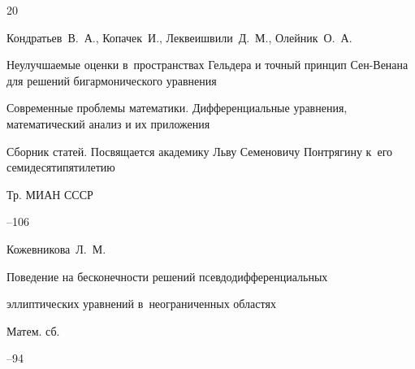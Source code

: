 \begin{thebibliography}{20}








\by Кондратьев~В.~А.,  Копачек~И.,  Леквеишвили~Д.~М., Олейник~О.~А.

\paper Неулучшаемые оценки в~пространствах Гельдера и точный принцип Сен-Венана для решений бигармонического уравнения

\inbook Современные проблемы математики. Дифференциальные уравнения, математический анализ и их приложения

\bookinfo Сборник статей. Посвящается академику Льву Семеновичу Понтрягину к~его семидесятипятилетию

\serial Тр. МИАН СССР



--106












\by Кожевникова~Л.~М.

\paper Поведение на бесконечности решений псевдодифференциальных

эллиптических уравнений в~неограниченных областях

\jour Матем. сб.




--94





\end{thebibliography}
